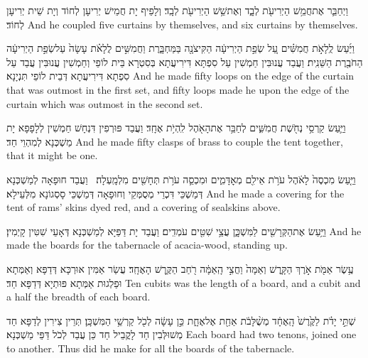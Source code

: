 {וַיְחַבֵּ֛ר אֶת\maqqaf חֲמֵ֥שׁ הַיְרִיעֹ֖ת לְבָ֑ד וְאֶת\maqqaf שֵׁ֥שׁ הַיְרִיעֹ֖ת לְבָֽד׃}
{וְלָפֵיף יָת חֲמֵישׁ יְרִיעָן לְחוֹד וְיָת שֵׁית יְרִיעָן לְחוֹד׃}
{And he coupled five curtains by themselves, and six curtains by themselves.}{}

{וַיַּ֜עַשׂ לֻֽלָאֹ֣ת חֲמִשִּׁ֗ים עַ֚ל שְׂפַ֣ת הַיְרִיעָ֔ה הַקִּיצֹנָ֖ה בַּמַּחְבָּ֑רֶת וַחֲמִשִּׁ֣ים לֻלָאֹ֗ת עָשָׂה֙ עַל\maqqaf שְׂפַ֣ת הַיְרִיעָ֔ה הַחֹבֶ֖רֶת הַשֵּׁנִֽית׃}
{וַעֲבַד עֲנוּבִּין חַמְשִׁין עַל סִפְתָּא דִּירִיעֲתָא בְּסִטְרָא בֵּית לוֹפֵי וְחַמְשִׁין עֲנוּבִּין עֲבַד עַל סִפְתָא דִּירִיעֲתָא דְּבֵית לוֹפֵי תִּנְיָנָא׃}
{And he made fifty loops on the edge of the curtain that was outmost in the first set, and fifty loops made he upon the edge of the curtain which was outmost in the second set.}{}

{וַיַּ֛עַשׂ קַרְסֵ֥י נְחֹ֖שֶׁת חֲמִשִּׁ֑ים לְחַבֵּ֥ר אֶת\maqqaf הָאֹ֖הֶל לִֽהְיֹ֥ת אֶחָֽד׃}
{וַעֲבַד פּוּרְפִין דִּנְחָשׁ חַמְשִׁין לְלָפָפָא יָת מַשְׁכְּנָא לְמִהְוֵי חַד׃}
{And he made fifty clasps of brass to couple the tent together, that it might be one.}{}

{וַיַּ֤עַשׂ מִכְסֶה֙ לָאֹ֔הֶל עֹרֹ֥ת אֵילִ֖ם מְאׇדָּמִ֑ים וּמִכְסֵ֛ה עֹרֹ֥ת תְּחָשִׁ֖ים מִלְמָֽעְלָה׃ \setuma }
{וַעֲבַד חוּפָאָה לְמַשְׁכְּנָא דְּמַשְׁכֵּי דִּכְרֵי מְסֻמְּקֵי וְחוּפָאָה דְּמַשְׁכֵּי סָסְגוֹנָא מִלְּעֵילָא׃}
{And he made a covering for the tent of rams’ skins dyed red, and a covering of sealskins above.}{}

{וַיַּ֥עַשׂ אֶת\maqqaf הַקְּרָשִׁ֖ים לַמִּשְׁכָּ֑ן עֲצֵ֥י שִׁטִּ֖ים עֹמְדִֽים׃}
{וַעֲבַד יָת דַּפַּיָּא לְמַשְׁכְּנָא דְּאָעֵי שִׁטִּין קָיְמִין׃}
{And he made the boards for the tabernacle of acacia-wood, standing up.}{}

{עֶ֥שֶׂר אַמֹּ֖ת אֹ֣רֶךְ הַקָּ֑רֶשׁ וְאַמָּה֙ וַחֲצִ֣י הָֽאַמָּ֔ה רֹ֖חַב הַקֶּ֥רֶשׁ הָאֶחָֽד׃}
{עֲשַׂר אַמִּין אוּרְכָּא דְּדַפָּא וְאַמְּתָא וּפַלְגוּת אַמְּתָא פּוּתְיָא דְּדַפָּא חַד׃}
{Ten cubits was the length of a board, and a cubit and a half the breadth of each board.}{}

{שְׁתֵּ֣י יָדֹ֗ת לַקֶּ֙רֶשׁ֙ הָֽאֶחָ֔ד מְשֻׁ֨לָּבֹ֔ת אַחַ֖ת אֶל\maqqaf אֶחָ֑ת כֵּ֣ן עָשָׂ֔ה לְכֹ֖ל קַרְשֵׁ֥י הַמִּשְׁכָּֽן׃}
{תְּרֵין צִירִין לְדַפָּא חַד מְשׁוּלְּבִין חַד לָקֳבֵיל חַד כֵּן עֲבַד לְכֹל דַּפֵּי מַשְׁכְּנָא׃}
{Each board had two tenons, joined one to another. Thus did he make for all the boards of the tabernacle.}{}

